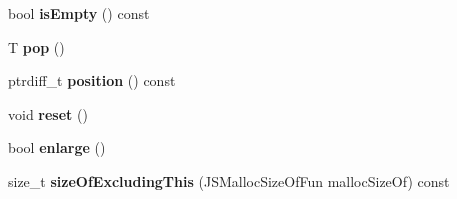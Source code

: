 \begin{DoxyCompactItemize}
\item 
\hypertarget{structjs_1_1_mark_stack_aa832b1de7d8e488e05964c3d53cabbd7}{bool {\bfseries is\-Empty} () const }\label{structjs_1_1_mark_stack_aa832b1de7d8e488e05964c3d53cabbd7}

\item 
\hypertarget{structjs_1_1_mark_stack_ab8ff9f1d2af14d9e3e78358aef9460df}{T {\bfseries pop} ()}\label{structjs_1_1_mark_stack_ab8ff9f1d2af14d9e3e78358aef9460df}

\item 
\hypertarget{structjs_1_1_mark_stack_a22dc09fef76a70c5be516fa532019e15}{ptrdiff\-\_\-t {\bfseries position} () const }\label{structjs_1_1_mark_stack_a22dc09fef76a70c5be516fa532019e15}

\item 
\hypertarget{structjs_1_1_mark_stack_a47d121a4666e40e423b464c06e143910}{void {\bfseries reset} ()}\label{structjs_1_1_mark_stack_a47d121a4666e40e423b464c06e143910}

\item 
\hypertarget{structjs_1_1_mark_stack_a6adeb4ef48ba6e128fca1af984d48e14}{bool {\bfseries enlarge} ()}\label{structjs_1_1_mark_stack_a6adeb4ef48ba6e128fca1af984d48e14}

\item 
\hypertarget{structjs_1_1_mark_stack_a24bb17032778d7b06e39074f5152f677}{size\-\_\-t {\bfseries size\-Of\-Excluding\-This} (J\-S\-Malloc\-Size\-Of\-Fun malloc\-Size\-Of) const }\label{structjs_1_1_mark_stack_a24bb17032778d7b06e39074f5152f677}

\end{DoxyCompactItemize}
